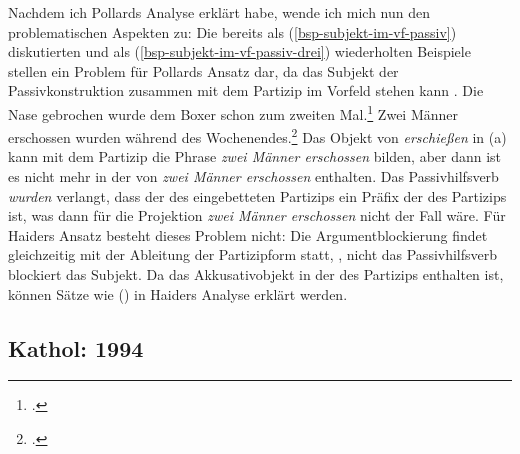 {Nachdem ich Pollards Analyse erklärt habe, wende ich mich nun den problematischen
Aspekten zu: Die bereits als (\ref{bsp-subjekt-im-vf-passiv}) diskutierten und als
(\ref{bsp-subjekt-im-vf-passiv-drei}) wiederholten Beispiele stellen ein Problem
für Pollards Ansatz dar, da das Subjekt der Passivkonstruktion
zusammen mit dem Partizip im Vorfeld stehen kann \citep[]{Mueller99a}.
\eal
\label{bsp-subjekt-im-vf-passiv-drei}
\ex{}
Die Nase gebrochen wurde dem Boxer schon zum zweiten Mal.\footnote{
        .
}
\ex{}
Zwei Männer erschossen wurden    während des Wochenendes.\footnote{
        .%
        }
\label{bsp-subjekt-im-vf-passiv-letzt-drei}
\zl
Das Objekt von \emph{erschießen} in (a) kann mit dem Partizip die Phrase
\emph{zwei Männer erschossen} bilden, aber dann ist es nicht mehr in der \compsl von
\emph{zwei Männer erschossen} enthalten. Das Passivhilfsverb \emph{wurden} verlangt,
dass der \ergw des eingebetteten Partizips ein Präfix der \compsl des Partizips ist,
was dann für die Projektion \emph{zwei Männer erschossen} nicht der Fall wäre.
Für Haiders Ansatz besteht dieses Problem nicht: Die Argumentblockierung
findet gleichzeitig mit der Ableitung der Partizipform statt, \dash, nicht das Passivhilfsverb
blockiert das Subjekt. Da das Akkusativobjekt in der \compsl des Partizips enthalten
ist, können Sätze wie () in Haiders Analyse erklärt werden.


\subsection{Kathol: 1994}
\label{sec-kathol-passive-raising}

}
